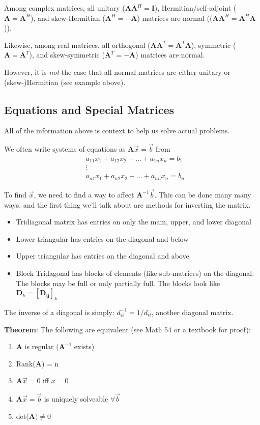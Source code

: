 \documentclass[12pt]{article}
\newcommand{\ve}[1]{\ensuremath{\mathbf{#1}}}
\begin{document}
Among complex matrices, all unitary ($\ve{AA}^H = \ve{I}$), Hermitian/self-adjoint ($\ve{A} = \ve{A}^H$), and skew-Hermitian ($\ve{A}^H = -\ve{A}$) matrices are normal (($\ve{AA}^H = \ve{A}^H\ve{A}$)). 

Likewise, among real matrices, all orthogonal ($\ve{AA}^T = \ve{A}^T\ve{A}$), symmetric ($\ve{A} = \ve{A}^T$), and skew-symmetric ($\ve{A}^T = -\ve{A}$) matrices are normal. 

However, it is \textit{not} the case that all normal matrices are either unitary or (skew-)Hermitian (see example above).%

\subsection*{Equations and Special Matrices}

All of the information above is context to help us solve actual problems. 

We often write systems of equations as $\ve{A}\vec{x} = \vec{b}$ from
\begin{align}
&a_{11} x_1 + a_{12} x_2 + \dots + a_{1n} x_n = b_1 \nonumber \\
&\vdots \nonumber \\
&a_{n1} x_1 + a_{n2} x_2 + \dots + a_{nn} x_n = b_n \nonumber
\end{align}

To find $\vec{x}$, we need to find a way to affect $\ve{A}^{-1}\vec{b}$. This can be done many many ways, and the first thing we'll talk about are methods for inverting the matrix.

\begin{itemize}
\item Tridiagonal matrix has entries on only the main, upper, and lower diagonal
\item Lower triangular has entries on the diagonal and below
\item Upper triangular has entries on the diagonal and above 
\item Block Tridagonal has blocks of elements (like sub-matrices) on the diagonal. The blocks may be full or only partially full. The blocks look like $\ve{D}_k = [\ve{D_{ij}}]_k$
\end{itemize}

The inverse of a diagonal is simply: $d_{ii}^{-1} = 1/d_{ii}$, another diagonal matrix.

\textbf{Theorem}: The following are equivalent (see Math 54 or a textbook for proof):
%
\begin{enumerate}
\item $\ve{A}$ is regular ($\ve{A}^{-1}$ exists)
\item Rank($\ve{A}$) = n
\item $\ve{A}\vec{x} = 0$ iff $x=0$
\item $\ve{A}\vec{x} = \vec{b}$ is uniquely solveable $\forall \vec{b}$
\item det($\ve{A}) \neq 0$
\end{enumerate}
\end{document}
